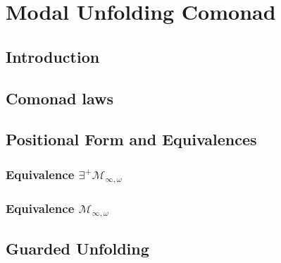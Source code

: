 \chapter{Modal Unfolding Comonad}
\section{Introduction}
\section{Comonad laws}
\section{Positional Form and Equivalences}
\subsection{Equivalence $\exists^{+}\mathcal{M}_{\infty,\omega}$}
\subsection{Equivalence $\mathcal{M}_{\infty,\omega}$}
\section{Guarded Unfolding}
